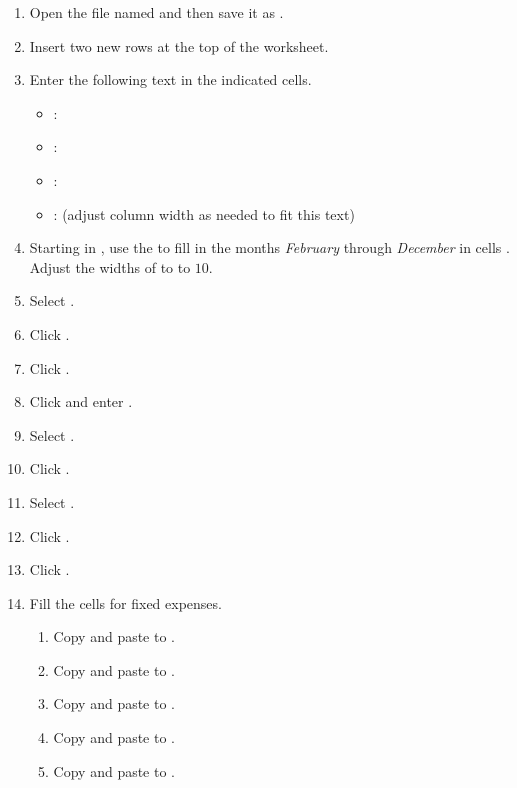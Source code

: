 \begin{enumerate}
	\item Open the file named  and then save it as .
	\item Insert two new rows at the top of the worksheet.
	\item Enter the following text in the indicated cells.

\begin{itemize}
	\item {}: 
	\item {}: 
	\item {}: 
	\item {}:  (adjust column width as needed to fit this text)
\end{itemize}

	\item Starting in , use the  to fill in the months \textit{February} through \textit{December} in cells . Adjust the widths of  to  to $ 10 $.
	\item Select .
	\item Click .
	\item Click . 
	\item Click  and enter . 
	\item Select .
	\item Click .
	\item Select .
	\item Click .
	\item Click . 

	\item Fill the cells for fixed expenses.
	\begin{enumerate}
		\item Copy  and paste to .
		\item Copy  and paste to .
		\item Copy  and paste to .
		\item Copy  and paste to .
		\item Copy  and paste to .
	\end{enumerate}	
	

\end{enumerate}

